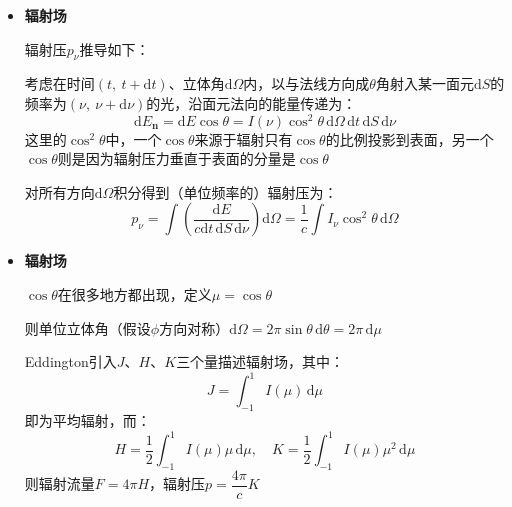 \documentclass{beamer}
\renewcommand{\bm}{\symbf}
\newenvironment{slide}{
    \begin{frame}{\bfseries{\sectiontitle}}
}{
    \end{frame}
}
\begin{document}
\begin{slide}
    \begin{itemize}
        \item \textbf{辐射场}

        辐射压$p_\nu$推导如下：

        考虑在时间$(t,\ t+\mathrm{d}t)$、立体角$\mathrm{d}\Omega$内，以与法线方向成$\theta$角射入某一面元$\mathrm{d}S$的频率为$(\nu,\ \nu+\mathrm{d}\nu)$的光，沿面元法向的能量传递为：
        \[
            \mathrm{d}E_{\bm{n}} = \mathrm{d}E\cos\theta = I(\nu)\cos^2\theta\,\mathrm{d}\Omega\,\mathrm{d}t\,\mathrm{d}S\,\mathrm{d}\nu
        \]
        这里的$\cos^2\theta$中，一个$\cos\theta$来源于辐射只有$\cos\theta$的比例投影到表面，另一个$\cos\theta$则是因为辐射压力垂直于表面的分量是$\cos\theta$

        对所有方向$\mathrm{d}\Omega$积分得到（单位频率的）辐射压为：
        \[
            p_\nu = \int \left(\frac{\mathrm{d}E}{c\mathrm{d}t\,\mathrm{d}S\,\mathrm{d}\nu}\right)\mathrm{d}\Omega = \frac{1}{c}\int I_\nu\cos^2\theta\,\mathrm{d}\Omega
        \]
    \end{itemize}
\end{slide}

\begin{slide}
    \begin{itemize}
        \item \textbf{辐射场}

        $\cos\theta$在很多地方都出现，定义$\mu=\cos\theta$

        则单位立体角（假设$\phi$方向对称）$\mathrm{d}\Omega=2\pi\sin\theta\,\mathrm{d}\theta=2\pi\,\mathrm{d}\mu$

        Eddington引入$J$、$H$、$K$三个量描述辐射场，其中：
        \[
            J=\int_{-1}^1 I(\mu)\,\mathrm{d}\mu
        \]
        即为平均辐射，而：
        \[
            H = \frac{1}{2}\int_{-1}^{1} I(\mu)\mu\,\mathrm{d}\mu,\quad
            K = \frac{1}{2}\int_{-1}^{1} I(\mu)\mu^2\,\mathrm{d}\mu
        \]
        则辐射流量$F=4\pi H$，辐射压$p=\dfrac{4\pi}{c}K$
    \end{itemize}
\end{slide}
\end{document}
